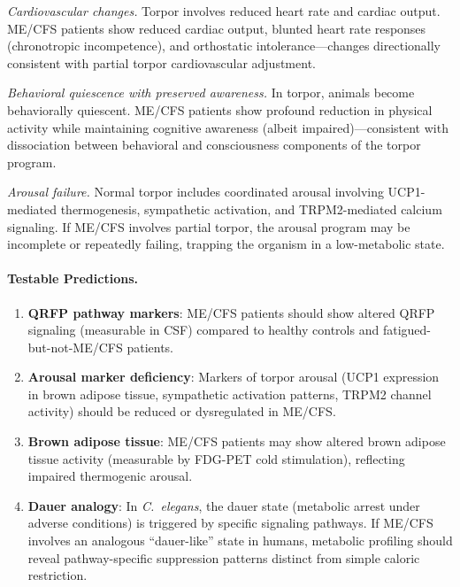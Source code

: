 \begin{speculation}
\textit{Cardiovascular changes.} Torpor involves reduced heart rate and cardiac output. ME/CFS patients show reduced cardiac output, blunted heart rate responses (chronotropic incompetence), and orthostatic intolerance---changes directionally consistent with partial torpor cardiovascular adjustment.

\textit{Behavioral quiescence with preserved awareness.} In torpor, animals become behaviorally quiescent. ME/CFS patients show profound reduction in physical activity while maintaining cognitive awareness (albeit impaired)---consistent with dissociation between behavioral and consciousness components of the torpor program.

\textit{Arousal failure.} Normal torpor includes coordinated arousal involving UCP1-mediated thermogenesis, sympathetic activation, and TRPM2-mediated calcium signaling. If ME/CFS involves partial torpor, the arousal program may be incomplete or repeatedly failing, trapping the organism in a low-metabolic state.

\paragraph{Testable Predictions.}
\begin{enumerate}
    \item \textbf{QRFP pathway markers}: ME/CFS patients should show altered QRFP signaling (measurable in CSF) compared to healthy controls and fatigued-but-not-ME/CFS patients.
    \item \textbf{Arousal marker deficiency}: Markers of torpor arousal (UCP1 expression in brown adipose tissue, sympathetic activation patterns, TRPM2 channel activity) should be reduced or dysregulated in ME/CFS.
    \item \textbf{Brown adipose tissue}: ME/CFS patients may show altered brown adipose tissue activity (measurable by FDG-PET cold stimulation), reflecting impaired thermogenic arousal.
    \item \textbf{Dauer analogy}: In \textit{C.\ elegans}, the dauer state (metabolic arrest under adverse conditions) is triggered by specific signaling pathways. If ME/CFS involves an analogous ``dauer-like'' state in humans, metabolic profiling should reveal pathway-specific suppression patterns distinct from simple caloric restriction.
\end{enumerate}


\end{speculation}
